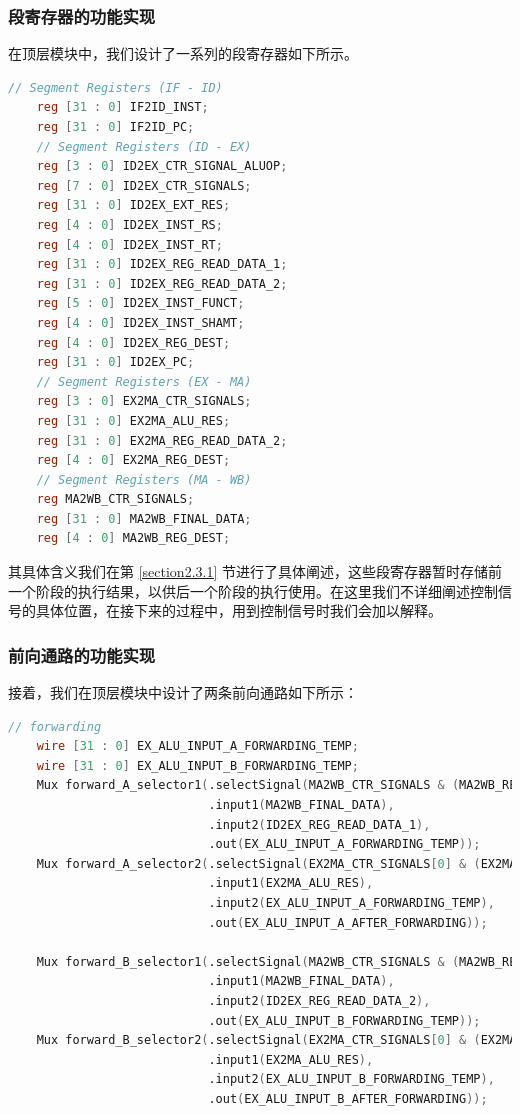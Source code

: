 \documentclass{cumcm}
\numberwithin{equation}{section}
\numberwithin{equation}{subsection}
\begin{document}
\subsubsection{段寄存器的功能实现}\label{section3.2.1}
在顶层模块中，我们设计了一系列的段寄存器如下所示。

\begin{lstlisting}[language=verilog]
    // Segment Registers (IF - ID)
    reg [31 : 0] IF2ID_INST;
    reg [31 : 0] IF2ID_PC;
    // Segment Registers (ID - EX)
    reg [3 : 0] ID2EX_CTR_SIGNAL_ALUOP;
    reg [7 : 0] ID2EX_CTR_SIGNALS;
    reg [31 : 0] ID2EX_EXT_RES;
    reg [4 : 0] ID2EX_INST_RS;
    reg [4 : 0] ID2EX_INST_RT;
    reg [31 : 0] ID2EX_REG_READ_DATA_1;
    reg [31 : 0] ID2EX_REG_READ_DATA_2;
    reg [5 : 0] ID2EX_INST_FUNCT;
    reg [4 : 0] ID2EX_INST_SHAMT;
    reg [4 : 0] ID2EX_REG_DEST;
    reg [31 : 0] ID2EX_PC;
    // Segment Registers (EX - MA)
    reg [3 : 0] EX2MA_CTR_SIGNALS;
    reg [31 : 0] EX2MA_ALU_RES;
    reg [31 : 0] EX2MA_REG_READ_DATA_2;
    reg [4 : 0] EX2MA_REG_DEST;
    // Segment Registers (MA - WB)
    reg MA2WB_CTR_SIGNALS;
    reg [31 : 0] MA2WB_FINAL_DATA;
    reg [4 : 0] MA2WB_REG_DEST;
\end{lstlisting}

其具体含义我们在第 \ref{section2.3.1} 节进行了具体阐述，这些段寄存器暂时存储前一个阶段的执行结果，以供后一个阶段的执行使用。在这里我们不详细阐述控制信号的具体位置，在接下来的过程中，用到控制信号时我们会加以解释。
\subsubsection{前向通路的功能实现}\label{section3.2.2}
接着，我们在顶层模块中设计了两条前向通路如下所示：
\begin{lstlisting}[language=verilog]
    // forwarding
    wire [31 : 0] EX_ALU_INPUT_A_FORWARDING_TEMP;
    wire [31 : 0] EX_ALU_INPUT_B_FORWARDING_TEMP;
    Mux forward_A_selector1(.selectSignal(MA2WB_CTR_SIGNALS & (MA2WB_REG_DEST == ID2EX_INST_RS)),
                            .input1(MA2WB_FINAL_DATA),
                            .input2(ID2EX_REG_READ_DATA_1),
                            .out(EX_ALU_INPUT_A_FORWARDING_TEMP));
    Mux forward_A_selector2(.selectSignal(EX2MA_CTR_SIGNALS[0] & (EX2MA_REG_DEST == ID2EX_INST_RS)),
                            .input1(EX2MA_ALU_RES),
                            .input2(EX_ALU_INPUT_A_FORWARDING_TEMP),
                            .out(EX_ALU_INPUT_A_AFTER_FORWARDING));
    
    Mux forward_B_selector1(.selectSignal(MA2WB_CTR_SIGNALS & (MA2WB_REG_DEST == ID2EX_INST_RT)),
                            .input1(MA2WB_FINAL_DATA),
                            .input2(ID2EX_REG_READ_DATA_2),
                            .out(EX_ALU_INPUT_B_FORWARDING_TEMP));
    Mux forward_B_selector2(.selectSignal(EX2MA_CTR_SIGNALS[0] & (EX2MA_REG_DEST == ID2EX_INST_RT)),
                            .input1(EX2MA_ALU_RES),
                            .input2(EX_ALU_INPUT_B_FORWARDING_TEMP),
                            .out(EX_ALU_INPUT_B_AFTER_FORWARDING));
\end{lstlisting}
\end{document}
